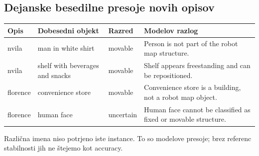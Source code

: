 \subsection*{Dejanske besedilne presoje novih opisov}\begin{center}\small\begin{tabular}{p{1.6cm}p{4.2cm}p{1.8cm}p{7.6cm}}\toprule
Opis & Dobesedni objekt & Razred & Modelov razlog \\ \midrule
nvila & man in white shirt & movable & Person is not part of the robot map structure. \\
nvila & shelf with beverages and snacks & movable & Shelf appears freestanding and can be repositioned. \\
florence & convenience store & movable & Convenience store is a building, not a robot map object. \\
florence & human face & uncertain & Human face cannot be classified as fixed or movable structure. \\
\bottomrule\end{tabular}\end{center}
Različna imena niso potrjeno iste instance. To so modelove presoje; brez referenc stabilnosti jih ne štejemo kot accuracy.

\newpage
